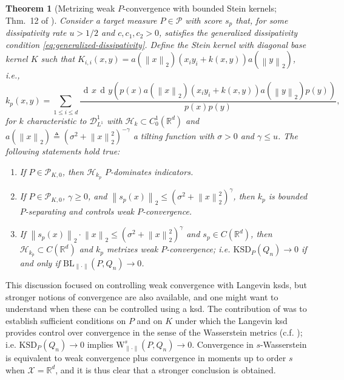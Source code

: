 \documentclass[12pt,paper=letter]{scrreprt}
\newtheorem{theorem}{Theorem}[chapter]
\newcommand{\dee}{\mathop{\mathrm{d}\!}}
\newcommand{\dx}{\,\dee x}
\newcommand{\dy}{\,\dee y}
\newcommand{\sss}[1]{\scriptscriptstyle{#1}}
\def\defeq{\triangleq} %
\def\defn{\defeq} %
\def\norm#1{\left\|{#1}\right\|} %
\newcommand{\twonorm}[1]{\norm{#1}_2} %
\newcommand{\Pset}[0]{\mathcal{P}} %
\newcommand{\p}{p} %
\renewcommand{\k}{k}
\newcommand{\Kb}{K} %
\newcommand{\ks}{\k_{\p}}%
\newcommand{\embedtozero}[1][\Kb]{\Pset_{\!\sss{#1,0}}}
\def\H{\mathcal{H}}
\newcommand{\Dset}{\mathscr{D}}
\newcommand{\DL}[1]{\Dset^{#1}_{\sss{L^1}}}
\newcommand{\HK}{\H_{\k}}
\begin{document}
\begin{theorem}[Metrizing weak $P$-convergence with bounded Stein kernels; Thm.~12 of \citealp{barp2022targeted}] \label{tilted-tightness}
Consider a target measure $P\in\Pset$ with score $s_p$
that, for some dissipativity rate $u > 1/2$ and $c, c_1,c_2 > 0$, satisfies the generalized dissipativity condition \cref{eq:generalized-dissipativity}.  
Define the Stein kernel with diagonal base kernel $K$ such that $K_{i,i}( x, y) = a(\twonorm{ x}) ( x_i  y_i +\k( x,  y)) a(\twonorm{ y}) $, i.e.,
\[
\ks( x, y) =
	\sum_{1 \leq i \leq d} \frac{\dx \dy(p( x) a(\twonorm{ x}) ( x_i  y_i +\k( x,  y)) a(\twonorm{ y}) p( y) )}{p( x)p( y)},
\]
for $\k$ characteristic to $\DL{1}$ with $\HK \subset C_0^1(\mathbb{R}^d)$
and $a(\twonorm{ x}) \defn (\sigma^2 + \twonorm{ x}^2)^{-\gamma}$ a tilting function with $\sigma > 0$ and $\gamma \leq u$.
The following statements hold true:
\begin{enumerate}[label=\textup{(\alph*)}]
    \item If $P\in\embedtozero$, then $\H_{\ks}$ $P$-dominates indicators.
    \item If $P\in\embedtozero$, $\gamma \geq 0$, and $\twonorm{s_p(x)} \leq (\sigma^2 + \twonorm{ x}^2)^{\gamma}$, then $\ks$ is bounded $P$-separating and controls weak $P$-convergence.
    \item If $\twonorm{s_p( x)}\cdot \twonorm{x} \leq (\sigma^2 + \twonorm{ x}^2)^{\gamma}$  and $s_p\in C(\mathbb{R}^d)$, then $\H_{\ks} \subset C(\mathbb{R}^d)$  and $\ks$ metrizes weak $P$-convergence; i.e. $\mathrm{KSD}_P(Q_n) \rightarrow 0$ if and only if $\mathrm{BL}_{\|\cdot\|}(P,Q_n) \rightarrow 0$.
\end{enumerate}
\end{theorem}







This discussion focused on controlling weak convergence with Langevin \acp{ksd}, but stronger notions of convergence are also available, and one might want to understand when these can be controlled using a \ac{ksd}.
The contribution of \citet{kanagawa2022controlling} was to establish sufficient conditions on $P$ and on $K$ under which the Langevin \ac{ksd} provides control over convergence in the sense of the Wasserstein metrics (c.f. ); i.e. $\mathrm{KSD}_P(Q_n) \rightarrow 0$ implies $\mathrm{W}_{\|\cdot\|}^s(P,Q_n) \rightarrow 0$.
Convergence in $s$-Wasserstein is equivalent to weak convergence plus convergence in moments up to order $s$ when $\mathcal{X} = \mathbb{R}^d$, and it is thus clear that a stronger conclusion is obtained.
\end{document}
